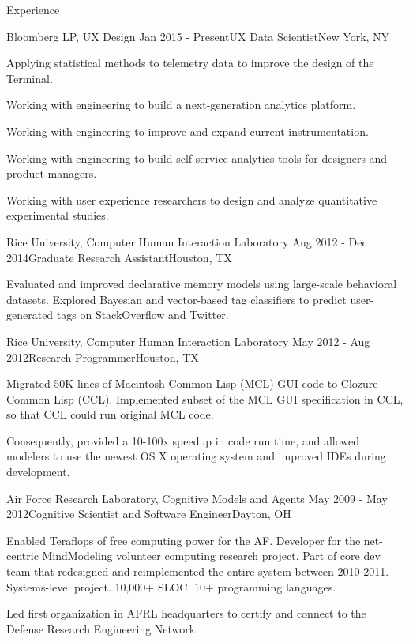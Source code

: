 
\begin{rSection}{Experience}

  \begin{rSubsection}{Bloomberg LP, UX Design}
    {Jan 2015 - Present}{UX Data Scientist}{New York, NY}
  \item Applying statistical methods to telemetry data to improve the design of the Terminal.
  \item Working with engineering to build a next-generation analytics platform.
  \item Working with engineering to improve and expand current instrumentation.
  \item Working with engineering to build self-service analytics tools for designers and product managers.
  \item Working with user experience researchers to design and analyze quantitative experimental studies.
  \end{rSubsection}

  \begin{rSubsection}{Rice University, Computer Human Interaction Laboratory}
    {Aug 2012 - Dec 2014}{Graduate Research Assistant}{Houston, TX}
  \item Evaluated and improved declarative memory models using large-scale behavioral datasets.
    Explored Bayesian and vector-based tag classifiers to predict user-generated tags on StackOverflow and Twitter.
  \end{rSubsection}

  \begin{rSubsection}{Rice University, Computer Human Interaction Laboratory}
    {May 2012 - Aug 2012}{Research Programmer}{Houston, TX}
  \item Migrated 50K lines of Macintosh Common Lisp (MCL) GUI code to Clozure Common Lisp (CCL).
    Implemented subset of the MCL GUI specification in CCL, so that CCL could run original MCL code.
  \item Consequently, provided a 10-100x speedup in code run time, and allowed modelers to use the newest OS X operating system and improved IDEs during development.
  \end{rSubsection}

  \begin{rSubsection}{Air Force Research Laboratory, Cognitive Models and Agents}
    {May 2009 - May 2012}{Cognitive Scientist and Software Engineer}{Dayton, OH}
  \item 
    Enabled Teraflops of free computing power for the AF.
    Developer for the net-centric MindModeling volunteer computing research project.
    Part of core dev team that redesigned and reimplemented the entire system between 2010-2011.
    Systems-level project. 10,000+ SLOC. 10+ programming languages. 
  \item
    Led first organization in AFRL headquarters to certify and connect to the Defense Research Engineering Network.
  \end{rSubsection}


\end{rSection}
